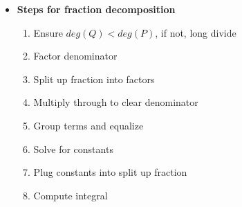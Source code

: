 \documentclass{report}
\begin{document}
\begin{itemize}
        \item \textbf{Steps for fraction decomposition}
            \begin{enumerate}
                \item Ensure $deg(Q) < deg(P)$, if not, long divide
                \item Factor denominator
                \item Split up fraction into factors
                \item Multiply through to clear denominator
                \item Group terms and equalize
                \item Solve for constants
                \item Plug constants into split up fraction
                \item Compute integral
            \end{enumerate}


\end{itemize}
\end{document}
